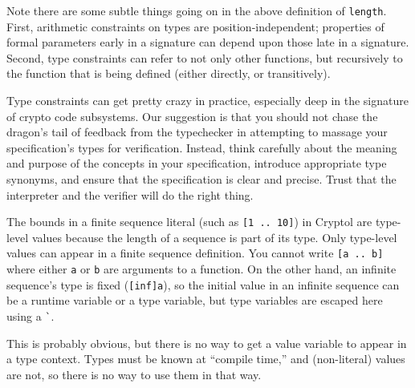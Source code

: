 \begin{tip}
  Note there are some subtle things going on in the above definition
  of \texttt{length}.  First, arithmetic constraints on types are
  position-independent; properties of formal parameters early in a
  signature can depend upon those late in a signature.  Second, type
  constraints can refer to not only other functions, but recursively
  to the function that is being defined (either directly, or
  transitively).

  Type constraints can get pretty crazy in practice, especially deep
  in the signature of crypto code subsystems.  Our suggestion is that
  you should not chase the dragon's tail of feedback from the
  typechecker in attempting to massage your specification's types for
  verification.  Instead, think carefully about the meaning and
  purpose of the concepts in your specification, introduce appropriate
  type synonyms, and ensure that the specification is clear and
  precise.  Trust that the interpreter and the verifier will do the
  right thing.
\end{tip}

The bounds in a finite sequence literal (such as \texttt{[1 ..\ 10]}) in
Cryptol are type-level values because the length of a sequence is part
of its type.  Only type-level values can appear in a finite sequence
definition.  You cannot write \texttt{[a ..\ b]} where either \texttt{a} or
\texttt{b} are arguments to a function.  On the other hand, an infinite
sequence's type is fixed (\texttt{[inf]a}), so the initial value in an
infinite sequence can be a runtime variable or a type variable, but
type variables are escaped here using a {\tt \Verb|`|}.



This is probably obvious, but there is no way to get a value variable
to appear in a type context.  Types must be known at ``compile time,''
and (non-literal) values are not, so there is no way to use them in
that way.


